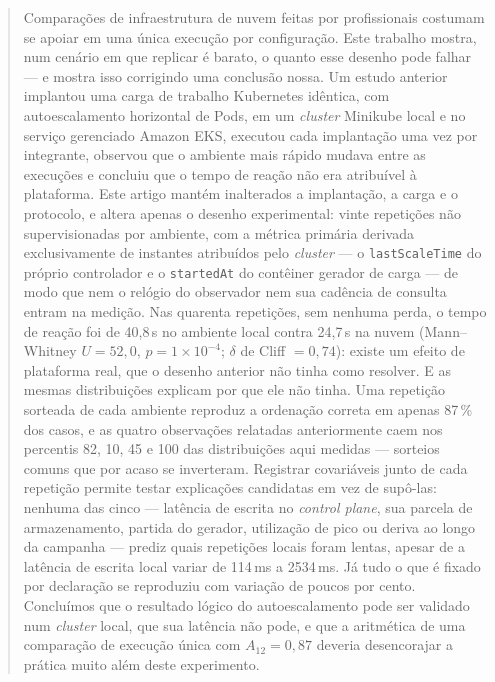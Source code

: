 \documentclass[conference]{IEEEtran}
\begin{document}
\begin{abstract}
Comparações de infraestrutura de nuvem feitas por profissionais costumam se
apoiar em uma única execução por configuração. Este trabalho mostra, num cenário
em que replicar é barato, o quanto esse desenho pode falhar --- e mostra isso
corrigindo uma conclusão nossa. Um estudo anterior implantou uma carga de
trabalho Kubernetes idêntica, com autoescalamento horizontal de Pods, em um
\emph{cluster} Minikube local e no serviço gerenciado Amazon EKS, executou cada
implantação uma vez por integrante, observou que o ambiente mais rápido mudava
entre as execuções e concluiu que o tempo de reação não era atribuível à
plataforma. Este artigo mantém inalterados a implantação, a carga e o protocolo,
e altera apenas o desenho experimental: vinte repetições não supervisionadas por
ambiente, com a métrica primária derivada exclusivamente de instantes atribuídos
pelo \emph{cluster} --- o \texttt{lastScaleTime} do próprio controlador e o
\texttt{startedAt} do contêiner gerador de carga --- de modo que nem o relógio do
observador nem sua cadência de consulta entram na medição. Nas quarenta
repetições, sem nenhuma perda, o tempo de reação foi de 40,8\,s no ambiente local
contra 24,7\,s na nuvem (Mann--Whitney $U=52,0$, $p=1\times10^{-4}$;
$\delta$ de Cliff $=0{,}74$): existe um efeito de plataforma real, que o desenho
anterior não tinha como resolver. E as mesmas distribuições explicam por que ele
não tinha. Uma repetição sorteada de cada ambiente reproduz a ordenação correta
em apenas 87\,\% dos casos, e as quatro observações relatadas anteriormente caem
nos percentis 82, 10, 45 e 100 das distribuições aqui medidas --- sorteios comuns
que por acaso se inverteram. Registrar covariáveis junto de cada repetição
permite testar explicações candidatas em vez de supô-las: nenhuma das cinco
--- latência de escrita no \emph{control plane}, sua parcela de armazenamento,
partida do gerador, utilização de pico ou deriva ao longo da campanha --- prediz
quais repetições locais foram lentas, apesar de a latência de escrita local
variar de 114\,ms a 2534\,ms. Já tudo o que é fixado por declaração se reproduziu
com variação de poucos por cento. Concluímos que o resultado lógico do
autoescalamento pode ser validado num \emph{cluster} local, que sua latência não
pode, e que a aritmética de uma comparação de execução única com $A_{12}=0{,}87$
deveria desencorajar a prática muito além deste experimento.


\end{abstract}
\end{document}
